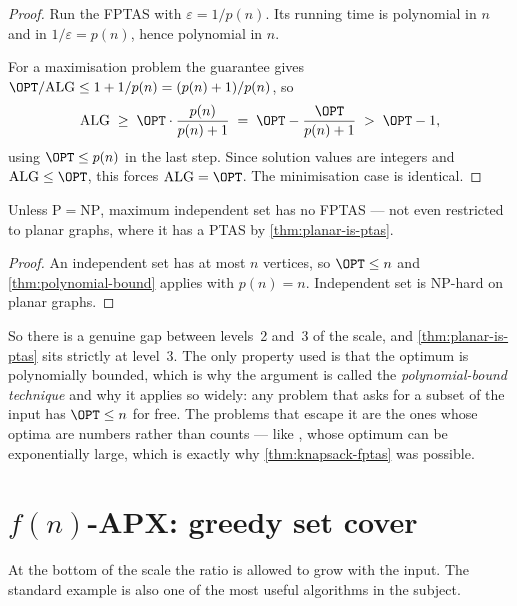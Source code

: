 \begin{proof}
Run the FPTAS with $\varepsilon = 1/p(n)$. Its running time is polynomial in $n$
and in $1/\varepsilon = p(n)$, hence polynomial in $n$.

For a maximisation problem the guarantee gives
$\OPT/\mathrm{ALG} \le 1 + 1/p(n) = (p(n)+1)/p(n)$, so
\[ \mathrm{ALG} \;\ge\; \OPT \cdot \frac{p(n)}{p(n)+1}
   \;=\; \OPT - \frac{\OPT}{p(n)+1} \;>\; \OPT - 1, \]
using $\OPT \le p(n)$ in the last step. Since solution values are integers and
$\mathrm{ALG} \le \OPT$, this forces $\mathrm{ALG} = \OPT$. The minimisation
case is identical.
\end{proof}

\begin{corollary}\label{cor:no-fptas-is}
Unless $\mathrm{P} = \mathrm{NP}$, maximum independent set has no FPTAS --- not
even restricted to planar graphs, where it has a PTAS by
\cref{thm:planar-is-ptas}.
\end{corollary}

\begin{proof}
An independent set has at most $n$ vertices, so $\OPT \le n$ and
\cref{thm:polynomial-bound} applies with $p(n) = n$. Independent set is
\textrm{NP}-hard on planar graphs.
\end{proof}

So there is a genuine gap between levels~2 and~3 of the scale, and
\cref{thm:planar-is-ptas} sits strictly at level~3. The only property used is
that the optimum is polynomially bounded, which is why the argument is called
the \emph{polynomial-bound technique} and why it applies so widely: any problem
that asks for a subset of the input has $\OPT \le n$ for free. The problems that
escape it are the ones whose optima are numbers rather than counts --- like
, whose optimum can be exponentially large, which is exactly why
\cref{thm:knapsack-fptas} was possible.

\section{\texorpdfstring{$f(n)$}{f(n)}-APX: greedy set cover}
\label{sec:set-cover}

At the bottom of the scale the ratio is allowed to grow with the input. The
standard example is also one of the most useful algorithms in the subject.

